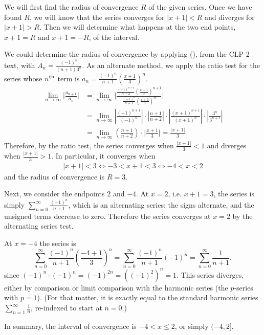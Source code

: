 \begin{solution}
We will first find the radius of convergence $R$ of the given series. Once we have found $R$, we will know 
that the series converges for $|x+1|<R$ and diverges for $|x+1|>R$. Then we will determine what 
happens at the two end points, $x+1=R$ and $x+1=-R$, of the interval.

We could determine the radius of convergence by applying (), from the CLP-2 text,
with  $A_n = \frac{(-1)^n}{(n+1)3^n}$. As an alternate method, we apply the ratio test for the series 
whose $n^{\rm th}$ term is $a_n= \frac{(-1)^n}{n+1} \left(\frac{x+1}{3}\right)^n$.
\begin{align*}
\lim_{n\to\infty} \bigg| \frac{a_{n+1}}{a_n} \bigg|
&= \lim_{n\to\infty} \bigg| \frac{ \frac{(-1)^{n+1}}{n+2} \left(\frac{x+1}{3}\right)^{n+1}}
                       { \frac{(-1)^n}{n+1} \left(\frac{x+1}{3}\right)^n} \bigg| \\
&= \lim_{n\to\infty}\left|\frac{(-1)^{n+1}}{(-1)^n} \right|\cdot\left|\frac{n+1}{n+2} \right|\cdot\left|\frac{(x+1)^{n+1}}{(x+1)^n} \right|\cdot\left|\frac{3^n}{3^{n+1}} \right| \\
&= \lim_{n\to\infty} \left(\frac{n+1}{n+2}\right)\cdot \bigg| \frac{x+1}3 \bigg| = \frac{|x+1|}3
\end{align*}
Therefore, by the ratio test, the series converges when $\frac{|x+1|}3 < 1$
and diverges when $\frac{|x+1|}3 > 1$. In particular, it converges when
\begin{align*}
|x+1| < 3 \iff -3 < x+1 < 3 \iff -4 < x < 2
\end{align*}
and the radius of convergence is $R = 3$. 

Next, we consider the endpoints $2$ and $-4$.
At $x=2$, i.e. $x+1=3$, the series is simply $\sum_{n=0}^\infty \frac{(-1)^{n}}{n+1}$,
which is an alternating series: the signs alternate, and the unsigned terms decrease to zero. Therefore the series converges at $x=2$ by the alternating series test.

At $x=-4$ the series is
$$\sum_{n=0}^\infty \frac{(-1)^{n}}{n+1} \left(\frac{-4+1}{3}\right)^n
 = \sum_{n=0}^\infty \frac{(-1)^{n}}{n+1} (-1)^n
 = \sum_{n=0}^\infty \frac1{n+1},$$
since $(-1)^n \cdot (-1)^n = (-1)^{2n} = \left((-1)^2\right)^n = 1$.
This series diverges, either by comparison or limit comparison with the harmonic series (the $p$-series with $p=1$). (For that matter, it is exactly equal to the standard harmonic
series $\sum_{n=1}^\infty \frac{1}{n}$, re-indexed to start at $n=0$.)

In summary, the interval of convergence is $-4<x\le2$, or simply $(-4,2]$.


\end{solution}



